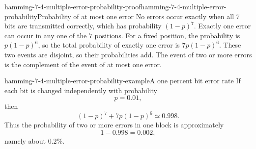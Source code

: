 \documentclass[preview]{standalone}
\begin{document}
\begin{snippetproof}{hamming-7-4-multiple-error-probability-proof}{hamming-7-4-multiple-error-probability}{Probability of at most one error}
    No errors occur exactly when all \(7\) bits are transmitted correctly,
    which has probability \((1-p)^7\). Exactly one error can occur in any one
    of the \(7\) positions. For a fixed position, the probability is
    \(p(1-p)^6\), so the total probability of exactly one error is
    \(7p(1-p)^6\). These two events are disjoint, so their probabilities add.
    The event of two or more errors is the complement of the event of at most
    one error.
\end{snippetproof}

\begin{snippetexample}{hamming-7-4-multiple-error-probability-example}{A one percent bit error rate}
    If each bit is changed independently with probability
    \[
        p=0.01,
    \]
    then
    \[
        (1-p)^7+7p(1-p)^6\simeq0.998.
    \]
    Thus the probability of two or more errors in one block is approximately
    \[
        1-0.998=0.002,
    \]
    namely about \(0.2\%\).
\end{snippetexample}
\end{document}
